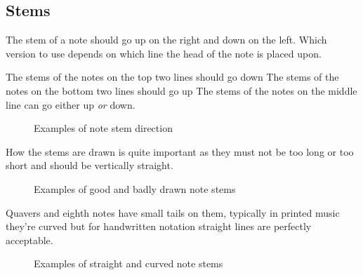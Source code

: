 \subsection*{Stems}

The stem of a note should go up on the right and down on the left. Which version to use depends on which line the head of the note is placed upon.

The stems of the notes on the top two lines should go down
The stems of the notes on the bottom two lines should go up
The stems of the notes on the middle line can go either up \emph{or} down.

\begin{figure}[h!]
  \centering
  \caption{Examples of note stem direction}
  \label{fig:StemsChromatic}
\end{figure}

How the stems are drawn is quite important as they must not be too long or too short and should be vertically straight.

\begin{figure}[h!]
  \centering
  \caption{Examples of good and badly drawn note stems}
  \label{fig:StemsGoodBad}
\end{figure}

Quavers and eighth notes have small tails on them, typically in printed music they're curved but for handwritten notation straight lines are perfectly acceptable.

\begin{figure}[h!]
  \centering
  \caption{Examples of straight and curved note stems}
  \label{fig:StemsStraightCurved}
\end{figure}

